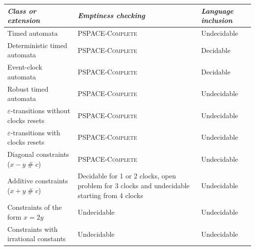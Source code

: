 \begin{table}[htbp]
\centering
\footnotesize
\begin{tabular}{|p{5cm}|p{4.5cm}|p{2.5cm}|}

	\hline
	
	\textit{Class or extension} &
	\textit{Emptiness checking} &
	\textit{Language inclusion} \\
	
	\hline \hline
	
	  Timed automata &
    \textsc{PSPACE-Complete} &
    Undecidable \\

    \hline

    Deterministic timed automata &
    \textsc{PSPACE-Complete} &
    Decidable \\

    \hline

    Event-clock automata &
    \textsc{PSPACE-Complete} &
    Decidable \\

    \hline

    Robust timed automata &
    \textsc{PSPACE-Complete} &
    Undecidable \\

    \hline \hline

    $\varepsilon$-transitions without clocks resets &
    \textsc{PSPACE-Complete} &
    Undecidable \\

    \hline

    $\varepsilon$-transitions with clocks resets &
    \textsc{PSPACE-Complete} &
    Undecidable \\

    \hline

    Diagonal constraints ($x - y \;\#\; c$)&
    \textsc{PSPACE-Complete} &
    Undecidable \\

    \hline

    Additive constraints ($x + y \;\#\; c$) &
    Decidable for 1 or 2 clocks, open problem for 3 clocks and undecidable starting from 4 clocks \cite{BerDuf-IPL2000} &
    Undecidable \\

    \hline
    
    Constraints of the form $x = 2y$ &
    Undecidable \cite{RADLD94} &
    Undecidable \\
    
    \hline
    
    Constraints with irrational constants &
    Undecidable \cite{Miller00} &
    Undecidable \\


\end{tabular}
\end{table}
